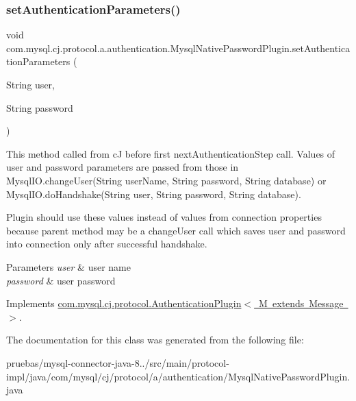 \subsubsection{\texorpdfstring{set\+Authentication\+Parameters()}{setAuthenticationParameters()}}
{\footnotesize\ttfamily void com.\+mysql.\+cj.\+protocol.\+a.\+authentication.\+Mysql\+Native\+Password\+Plugin.\+set\+Authentication\+Parameters (\begin{DoxyParamCaption}\item[{String}]{user,  }\item[{String}]{password }\end{DoxyParamCaption})}

This method called from cJ before first next\+Authentication\+Step call. Values of user and password parameters are passed from those in Mysql\+I\+O.\+change\+User(String user\+Name, String password, String database) or Mysql\+I\+O.\+do\+Handshake(String user, String password, String database).

Plugin should use these values instead of values from connection properties because parent method may be a change\+User call which saves user and password into connection only after successful handshake.


\begin{DoxyParams}{Parameters}
{\em user} & user name \\
\hline
{\em password} & user password \\
\hline
\end{DoxyParams}


Implements \mbox{\hyperlink{interfacecom_1_1mysql_1_1cj_1_1protocol_1_1_authentication_plugin_a22458c3992dbf9f91560d75a99e234d3}{com.\+mysql.\+cj.\+protocol.\+Authentication\+Plugin$<$ M extends Message $>$}}.



The documentation for this class was generated from the following file\+:\begin{DoxyCompactItemize}
\item 
pruebas/mysql-\/connector-\/java-\/8../src/main/protocol-\/impl/java/com/mysql/cj/protocol/a/authentication/Mysql\+Native\+Password\+Plugin.\+java\end{DoxyCompactItemize}
